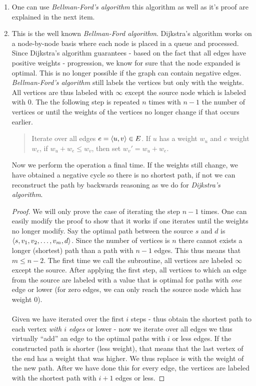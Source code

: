 \documentclass{article}
\begin{document}
\begin{exercise}
\begin{answer}
\begin{enumerate}
 \item One can use \emph{Bellman-Ford's algorithm} this algorithm as well as it's proof are explained in the next item.
 \item This is the well known \emph{Bellman-Ford algorithm}.
 Dijkstra's algorithm works on a node-by-node basis where each node is placed in a queue and processed. Since Dijkstra's algorithm guarantees - based on the fact that all edges have positive weights - progression, we know for sure that the node expanded is optimal. This is no longer possible if the graph can contain negative edges. \emph{Bellman-Ford's algorithm} still labels the vertices but only with the weights. All vertices are thus labeled with $\infty$ except the source node which is labeled with $0$. The the following step is repeated $n$ times with $n-1$ the number of vertices or until the weights of the vertices no longer change if that occurs earlier.
 \begin{quote}
 Iterate over all edges $e=\left\langle u,v \right\rangle\in E$. If $u$ has a weight $w_u$ and $e$ weight $w_e$, if $w_u+w_e\leq w_v$, then set $w_v'=w_u+w_e$.
 \end{quote}
 Now we perform the operation a final time. If the weights still change, we have obtained a negative cycle so there is no shortest path, if not we can reconstruct the path by backwards reasoning as we do for \emph{Dijkstra's algorithm}.
 \begin{proof}
 We will only prove the case of iterating the step $n-1$ times. One can easily modify the proof to show that it works if one iterates until the weights no longer modify.
 Say the optimal path between the source $s$ and $d$ is $\left\langle s,v_1,v_2,\ldots,v_m,d \right\rangle$. Since the number of vertices is $n$ there cannot exists a longer (shortest) path than a path with $n-1$ edges. This thus means that $m\leq n-2$. The first time we call the subroutine, all vertices are labeled $\infty$ except the source. After applying the first step, all vertices to which an edge from the source are labeled with a value that is optimal for paths with \emph{one} edge or lower (for zero edges, we can only reach the source node which has weight $0$).
 \paragraph{}
 Given we have iterated over the first $i$ steps - thus obtain the shortest path to each vertex \emph{with $i$ edges} or lower - now we iterate over all edges we thus virtually ``add'' an edge to the optimal paths with $i$ or less edges. If the constructed path is shorter (less weight), that means that the last vertex of the end has a weight that was higher. We thus replace is with the weight of the new path. After we have done this for every edge, the vertices are labeled with the shortest path with $i+1$ edges or less.

\end{proof}
\end{enumerate}
\end{answer}
\end{exercise}
\end{document}
